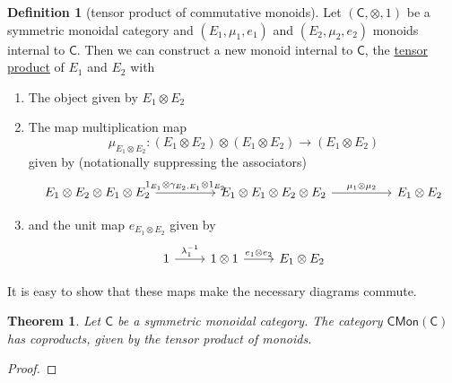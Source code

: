 \documentclass[a4paper,10pt]{scrreprt}
\newcommand{\defn}[1]{\ul{#1}}
\theoremstyle{definition}
\newtheorem{definition}{Definition}[section]
\theoremstyle{plain}
\newtheorem{theorem}{Theorem}[section]
\theoremstyle{remark}
\begin{document}
\begin{definition}[tensor product of commutative monoids]
  \label{def:tensorproductofcommutativemonoids}
  Let $(\mathsf{C}, \otimes, 1)$ be a symmetric monoidal category and $(E_{1}, \mu_{1}, e_{1})$ and $(E_{2}, \mu_{2}, e_{2})$ monoids internal to $\mathsf{C}$. Then we can construct a new monoid internal to $\mathsf{C}$, the \defn{tensor product} of $E_{1}$ and $E_{2}$ with

  \begin{enumerate}
    \item The object given by $E_{1} \otimes E_{2}$

    \item The map multiplication map
      \begin{equation*}
        \mu_{E_{1} \otimes E_{2}}\colon (E_{1} \otimes E_{2}) \otimes (E_{1} \otimes E_{2}) \to (E_{1} \otimes E_{2})
      \end{equation*}
      given by (notationally suppressing the associators)
      \begin{equation*}
        \begin{tikzcd}[column sep=huge]
          E_{1} \otimes E_{2} \otimes E_{1} \otimes E_{2} 
          \arrow[r, "{1_{E_{1}} \otimes \gamma_{E_{2}, E_{1}} \otimes 1_{E_{2}}}"]
          & E_{1} \otimes E_{1} \otimes E_{2} \otimes E_{2}  
          \arrow[r, "\mu_{1} \otimes \mu_{2}"]
          & E_{1} \otimes E_{2}
        \end{tikzcd}
      \end{equation*}

    \item and the unit map $e_{E_{1} \otimes E_{2}}$ given by
      \begin{equation*}
        \begin{tikzcd}
          1
          \arrow[r, "\lambda^{-1}_{1}"]
          & 1 \otimes 1
          \arrow[r, "e_{1} \otimes e_{2}"]
          & E_{1} \otimes E_{2}
        \end{tikzcd}
      \end{equation*}
  \end{enumerate}

  It is easy to show that these maps make the necessary diagrams commute.
\end{definition}

\begin{theorem}
  Let $\mathsf{C}$ be a symmetric monoidal category. The category $\mathsf{CMon}(\mathsf{C})$ has coproducts, given by the tensor product of monoids.
\end{theorem}
\begin{proof}
  
\end{proof}
\end{document}
